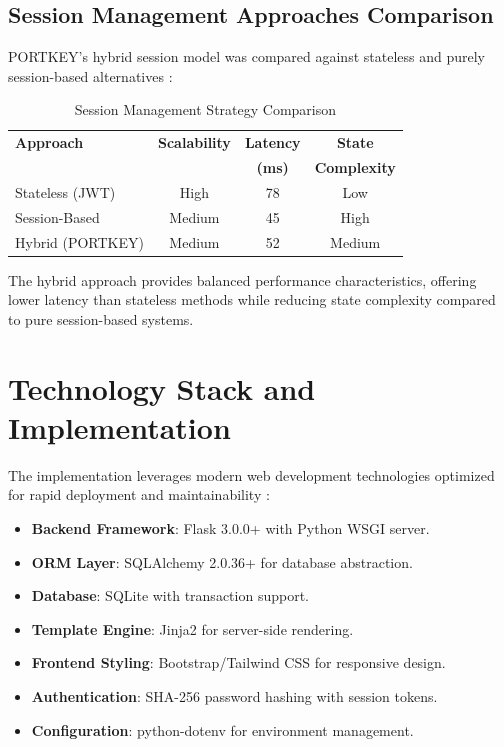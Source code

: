\documentclass[conference]{IEEEtran}
\begin{document}
\subsection{Session Management Approaches Comparison}

PORTKEY's hybrid session model was compared against stateless and purely session-based alternatives \cite{b62, b65, b68}:

\begin{table}[h]
\centering
\caption{Session Management Strategy Comparison}
\begin{tabular}{lccc}
\hline
\textbf{Approach} & \textbf{Scalability} & \textbf{Latency} & \textbf{State}\\
& & \textbf{(ms)} & \textbf{Complexity}\\
\hline
Stateless (JWT) & High & 78 & Low \\
Session-Based & Medium & 45 & High \\
Hybrid (PORTKEY) & Medium & 52 & Medium \\
\hline
\end{tabular}
\label{tab:session_comparison}
\end{table}

The hybrid approach provides balanced performance characteristics, offering lower latency than stateless methods while reducing state complexity compared to pure session-based systems.

\section{Technology Stack and Implementation}

The implementation leverages modern web development technologies optimized for rapid deployment and maintainability \cite{b72, b73, b89}:

\begin{itemize}
    \item \textbf{Backend Framework}: Flask 3.0.0+ with Python WSGI server.
    \item \textbf{ORM Layer}: SQLAlchemy 2.0.36+ for database abstraction.
    \item \textbf{Database}: SQLite with transaction support.
    \item \textbf{Template Engine}: Jinja2 for server-side rendering.
    \item \textbf{Frontend Styling}: Bootstrap/Tailwind CSS for responsive design.
    \item \textbf{Authentication}: SHA-256 password hashing with session tokens.
    \item \textbf{Configuration}: python-dotenv for environment management.
\end{itemize}
\end{document}
